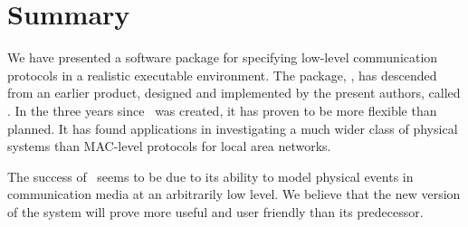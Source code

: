 \section{Summary}

We have presented a software package for specifying low-level
communication protocols in
a realistic executable environment.
The package, \smurph, has descended from an earlier product, designed
and implemented by the present authors, called \lansf.
In the three years since \lansf\ was created, it has proven to be
more flexible than planned.
It has found applications in investigating a much wider class 
of physical systems than MAC-level protocols for local area networks.

The success of \lansf\ seems to be due to its ability to model physical
events in communication media at an arbitrarily low level.
We believe that the new version of the system will prove more
useful and user friendly than its predecessor.
